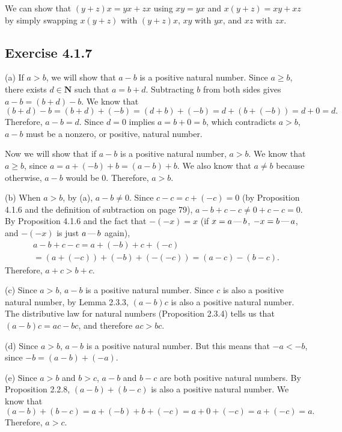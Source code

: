 \documentclass[12pt, oneside]{book}
\newcommand{\formalminus}{\, \text{\textemdash} \,}
\begin{document}
	We can show that $(y + z)x = yx + zx$ using $xy = yx$ and $x(y + z) = xy + xz$ by simply swapping $x(y + z)$ with $(y + z)x$, $xy$ with $yx$, and $xz$ with $zx$.

	\subsection*{Exercise 4.1.7}

	\noindent (a) If $a > b$, we will show that $a - b$ is a positive natural number. Since $a \ge b$, there exists $d \in \mathbf{N}$ such that $a = b + d$. Subtracting $b$ from both sides gives $a - b = (b + d) - b$. We know that \[(b + d) - b = (b + d) + (-b) = (d + b) + (-b) = d + (b + (-b)) = d + 0 = d.\] Therefore, $a - b = d$. Since $d = 0$ implies $a = b + 0 = b$, which contradicts $a > b$, $a - b$ must be a nonzero, or positive, natural number.

	Now we will show that if $a - b$ is a positive natural number, $a > b$. We know that $a \ge b$, since $a = a + (-b) + b = (a - b) + b$. We also know that $a \ne b$ because otherwise, $a - b$ would be $0$. Therefore, $a > b$.

	\bigskip
	\noindent (b) When $a > b$, by (a), $a - b \ne 0$. Since $c - c = c + (-c) = 0$ (by Proposition 4.1.6 and the definition of subtraction on page 79), $a - b + c - c \ne 0 + c - c = 0$. By Proposition 4.1.6 and the fact that $-(-x) = x$ (if $x = a \formalminus b$, $-x = b \formalminus a$, and $-(-x)$ is just $a \formalminus b$ again),
	\begin{multline*} a - b + c - c = a + (-b) + c + (-c) \\ = (a + (-c)) + (-b) + (-(-c)) = (a - c) - (b - c). \end{multline*}
	Therefore, $a + c > b + c$.

	\bigskip
	\noindent (c) Since $a > b$, $a - b$ is a positive natural number. Since $c$ is also a positive natural number, by Lemma 2.3.3, $(a - b)c$ is also a positive natural number. The distributive law for natural numbers (Proposition 2.3.4) tells us that $(a - b)c = ac - bc$, and therefore $ac > bc$.

	\bigskip
	\noindent (d) Since $a > b$, $a - b$ is a positive natural number. But this means that $-a < -b$, since $-b = (a - b) + (-a)$.

	\bigskip
	\noindent (e) Since $a > b$ and $b > c$, $a - b$ and $b - c$ are both positive natural numbers. By Proposition 2.2.8, $(a - b) + (b - c)$ is also a positive natural number. We know that \[(a - b) + (b - c) = a + (-b) + b + (-c) = a + 0 + (-c) = a + (-c) = a.\] Therefore, $a > c$.
\end{document}
